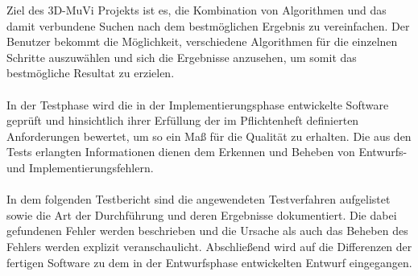 Ziel des 3D-MuVi Projekts ist es, die Kombination von Algorithmen und das damit verbundene Suchen nach dem bestmöglichen Ergebnis zu vereinfachen. Der Benutzer bekommt die Möglichkeit, verschiedene Algorithmen für die einzelnen Schritte auszuwählen und sich die Ergebnisse anzusehen, um somit das bestmögliche Resultat zu erzielen.
\\\\
In der Testphase wird die in der Implementierungsphase entwickelte Software geprüft und hinsichtlich ihrer Erfüllung der im Pflichtenheft definierten Anforderungen bewertet, um so ein Maß für die Qualität zu erhalten. Die aus den Tests erlangten Informationen dienen dem Erkennen und Beheben von Entwurfs- und Implementierungsfehlern.
\\\\
In dem folgenden Testbericht sind die angewendeten Testverfahren aufgelistet sowie die Art der Durchführung und deren Ergebnisse dokumentiert. Die dabei gefundenen Fehler werden beschrieben und die Ursache als auch das Beheben des Fehlers werden explizit veranschaulicht. Abschließend wird auf die Differenzen der fertigen Software zu dem in der Entwurfsphase entwickelten Entwurf eingegangen.
